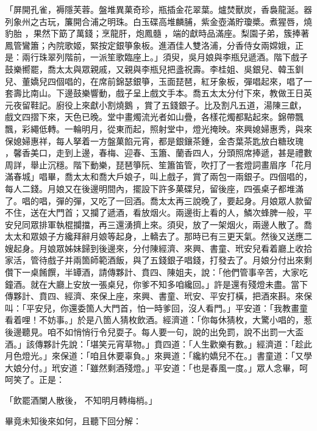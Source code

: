 \begin{showcontents}{}
「屏開孔雀，褥隱芙蓉。盤堆異菓奇珍，瓶插金花翠葉。爐焚獸炭，香裊龍涎。器列象州之古玩，簾開合浦之明珠。白玉碟高堆麟脯，紫金壺滿貯瓊槳。煮猩唇，燒豹胎 ，果然下筯了萬錢；烹龍肝，炮鳳髓 ，端的獻時品滿座。梨園子弟，簇捧著鳳管鸞簫；內院歌姬，緊按定銀箏象板。進酒佳人雙洛浦，分香侍女兩嫦娥，正是：兩行珠翠列階前，一派笙歌臨座上。」須臾，吳月娘與李瓶兒遞酒。階下戲子鼓樂嚮罷，喬太太與眾親戚，又親與李瓶兒把盞祝壽。李桂姐、吳銀兒、韓玉釧兒、董嬌兒四個唱的，在席前錦瑟銀箏，玉面琵琶，紅牙象板，彈唱起來，唱了一套壽比南山。下邊鼓樂響動，戲子呈上戲文手本。喬五太太分付下來，教做王日英元夜留鞋記。廚役上來獻小割燒鵝 ，賞了五錢銀子。比及割凡五道，湯陳三獻，戲文四摺下來，天色已晚。堂中畫燭流光者如山疊，各樣花燭都點起來。錦帶飄飄，彩繩低轉。一輪明月，從東而起，照射堂中，燈光掩映。來興媳婦惠秀，與來保媳婦惠祥，每人拏着一方盤菓餡元宵，都是銀鑲茶鍾，金杏葉茶匙放白糖玫瑰 ，馨香美口，走到上邊，春梅、迎春、玉簫、蘭香四人，分頭照席捧遞，甚是禮數周詳，舉止沉穩。階下動樂，琵琶箏阮、笙簫笛管，吹打了一套燈詞畫眉序「花月滿春城」唱畢，喬太太和喬大戶娘子，叫上戲子，賞了兩包一兩銀子。四個唱的，每人二錢。月娘又在後邊明間內，擺設下許多菓碟兒，留後座，四張桌子都堆滿了。唱的唱，彈的彈，又吃了一回酒。喬太太再三說晚了，要起身。月娘眾人款留不住，送在大門首；又攔了遞酒，看放烟火。兩邊街上看的人，鱗次蜂脾一般，平安兒同眾排軍執棍攔擋，再三還湧擠上來。須臾，放了一架烟火，兩邊人散了。喬太太和眾娘子方纔拜辭月娘等起身，上轎去了。那時已有三更天氣。然後又送應二嫂起身。月娘眾姊妹歸到後邊來，分付陳經濟、來興、書童、玳安兒看着廳上收拾家活，管待戲子并兩箇師範酒飯，與了五錢銀子唱錢，打發去了。月娘分付出來剩儹下一桌餚饌，半罈酒，請傳夥計、賁四、陳姐夫，說：「他們管事辛苦，大家吃鐘酒。就在大廳上安放一張桌兒，你爹不知多咱纔回。」許是還有殘燈未盡。當下傳夥計、賁四、經濟、來保上座，來興、書童、玳安、平安打橫，把酒來斟。來保叫：「平安兒，你還委箇人大門首，怕一時爹回，沒人看門。」平安道：「我教畫童看着哩！不妨事。」於是八箇人猜枚飲酒。經濟道：「你每休猜枚，大驚小唱的，惹後邊聽見。咱不如悄悄行令兒耍子。每人要一句，說的出免罰，說不出罰一大盃酒。」該傳夥計先說：「堪笑元宵草物。」賁四道：「人生歡樂有數。」經濟道：「趁此月色燈光。」來保道：「咱且休要辜負。」來興道：「纔約嬌兒不在。」書童道：「又學大娘分付。」玳安道：「雖然剩酒殘燈。」平安道：「也是春風一度。」眾人念畢，呵呵笑了。正是：

「飲罷酒闌人散後，  不知明月轉梅梢。」

畢竟未知後來如何，且聽下回分解：




\end{showcontents}


